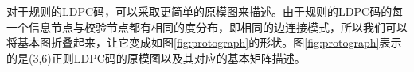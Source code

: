 对于规则的LDPC码，可以采取更简单的原模图来描述。由于规则的LDPC码的每一个信息节点与校验节点都有相同的度分布，即相同的边连接模式，所以我们可以将基本图折叠起来，让它变成如图\ref{fig:protograph}的形状。图\ref{fig:protograph}表示的是(3,6)正则LDPC码的原模图以及其对应的基本矩阵描述。
\begin{center}
\def\linkdoub{\draw [double distance=1mm, very thick] (0,0)--}
\def\linksing{\draw [very thick] (0,0)--}
\def\check{%
    \filldraw [fill=white,very thick] (0,0) circle (5pt);
    \draw [very thick] (0,3.5pt)--(0,-3.5pt);
    \draw [very thick] (3.5pt,0)--(-3.5pt,0);
}
\def\bit{%
    \filldraw [fill=white,very thick] (0,0) circle (5pt);
    \draw [very thick] (-3.2pt,2.2pt)--(3.2pt,2.2pt);
    \draw [very thick] (-3.2pt,-2.2pt)--(3.2pt,-2.2pt);
}
\def\thetaone{90}
\def\thetatwo{-90}
\def\armLength{0.9}
\def\symbolDist{1}
\label{fig:protograph}
\end{center}

